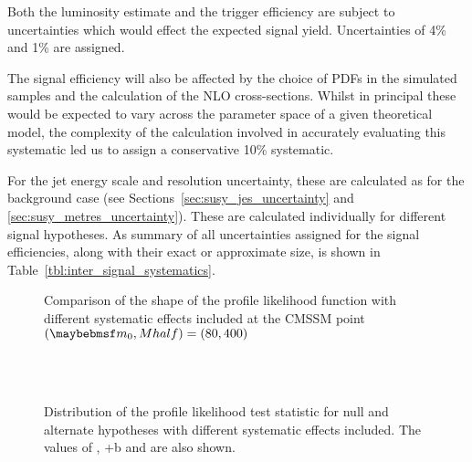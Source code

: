 Both the luminosity estimate and the trigger efficiency are subject to
uncertainties which would effect the expected signal yield. Uncertainties of 4\%
and 1\% are assigned.

The signal efficiency will also be affected by the choice of \acp{PDF} in the
simulated samples and the calculation of the \ac{NLO} cross-sections. Whilst in
principal these would be expected to vary across the parameter space of a given
theoretical model, the complexity of the calculation involved in accurately
evaluating this systematic led us to assign a conservative 10\% systematic.

For the jet energy scale and \MET resolution uncertainty, these are calculated
as for the background case (see Sections~\ref{sec:susy_jes_uncertainty} and
\ref{sec:susy_metres_uncertainty}). These are calculated individually for
different signal hypotheses. As summary of all uncertainties assigned for the
signal efficiencies, along with their exact or approximate size, is shown in
Table~\ref{tbl:inter_signal_systematics}.




\begin{figure}[h!]
\centering
{}\quad
{}
\caption[]{Comparison of the shape of the profile likelihood function with
  different systematic effects included at the \ac{CMSSM} point $(\Mzero, Mhalf)
  = (80, 400)$}
\label{fig:inter_pl}
\end{figure}

\begin{figure}[h!]
\centering
{}\quad
{}\\
\quad
{}\\
\caption[]{Distribution of the profile likelihood test statistic for null and
  alternate hypotheses with different systematic effects included. The values of
  \CLb, \CLs+b and \CLs are also shown.}
\label{fig:inter_cls}
\end{figure}

